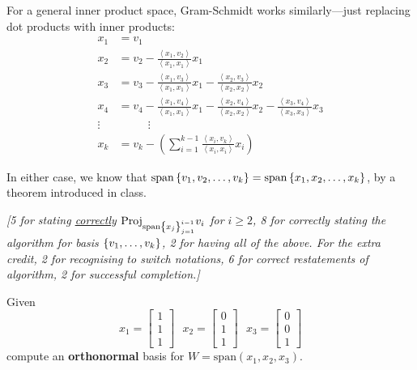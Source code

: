 \documentclass[answers,11pt]{exam}
\theoremstyle{definition}
\DeclareMathOperator{\1}{\mathbbm{1}}
\DeclareMathOperator{\Span}{span}
\renewcommand{\geq}{\geqslant}
\newcommand{\innerproduct}[2]{\left\langle #1,#2 \right\rangle}
\newcommand{\proj}[2]{\mathrm{Proj}_{#1} {#2} }
\begin{document}
\begin{questions}
\begin{parts}
\begin{solution}
		For a general inner product space, Gram-Schmidt works similarly---just replacing dot products with inner products:
		\begin{align*}
			x_1 &= v_1 \\
			x_2 &= v_2 - \frac{\innerproduct{x_1}{v_2}}{\innerproduct{x_1}{x_1}} x_1 \\
			x_3 &= v_3 - \frac{\innerproduct{x_1}{v_3}}{\innerproduct{x_1}{x_1}} x_1 - \frac{\innerproduct{x_2}{v_3}}{\innerproduct{x_2}{x_2}} x_2 \\
			x_4 &= v_4 - \frac{\innerproduct{x_1}{v_4}}{\innerproduct{x_1}{x_1}} x_1 - \frac{\innerproduct{x_2}{v_4}}{\innerproduct{x_2}{x_2}} x_2 - \frac{\innerproduct{x_3}{v_4}}{\innerproduct{x_3}{x_3}} x_3 \\
			\vdots & \phantom{==} \vdots \\
			x_k &= v_k - \left( \sum_{i=1}^{k-1} \frac{ \innerproduct{x_i}{v_k} }{\innerproduct{x_i}{x_i}} x_i \right)
		\end{align*}
		
		In either case, we know that $\Span\set{v_1,v_2,\dots,v_k} = \Span\set{x_1,x_2,\dots,x_k}$, by a theorem introduced in class.
		
		\textit{[5 for stating \uline{correctly} $\proj{\Span \set{ x_j}_{j=1}^{i-1} }{v_i}$ for $i \geq 2$, 8 for correctly stating the algorithm for basis $\set{v_1,\dots,v_k}$, 2 for having all of the above. For the extra credit, 2 for recognising to switch notations, 6 for correct restatements of algorithm, 2 for successful completion.]}
	\end{solution}
\end{parts}

\addpoints


\question[20] Given 
\begin{equation*}
x_1=
\begin{bmatrix}
1\\
1\\
1
\end{bmatrix}\:\:\:
x_2=
\begin{bmatrix}
0\\
1\\
1
\end{bmatrix}\:\:\:
x_3=
\begin{bmatrix}
0\\
0\\
1
\end{bmatrix}
\end{equation*}
compute an \textbf{orthonormal} basis for $W=\text{span}(x_1,x_2,x_3)$. 
\addpoints


\end{questions}
\end{document}
